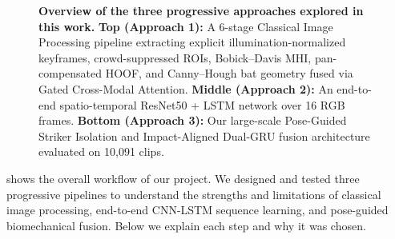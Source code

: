 \begin{figure}[t]
\caption{\textbf{Overview of the three progressive approaches explored in this work.} \textbf{Top (Approach 1):} A 6-stage Classical Image Processing pipeline extracting explicit illumination-normalized keyframes, crowd-suppressed ROIs, Bobick--Davis MHI, pan-compensated HOOF, and Canny--Hough bat geometry fused via Gated Cross-Modal Attention. \textbf{Middle (Approach 2):} An end-to-end spatio-temporal ResNet50 + LSTM network over 16 RGB frames. \textbf{Bottom (Approach 3):} Our large-scale Pose-Guided Striker Isolation and Impact-Aligned Dual-GRU fusion architecture evaluated on 10,091 clips.}
\label{fig:overview}
\end{figure}

 shows the overall workflow of our project. We designed and tested three progressive pipelines to understand the strengths and limitations of classical image processing, end-to-end CNN-LSTM sequence learning, and pose-guided biomechanical fusion. Below we explain each step and why it was chosen.

